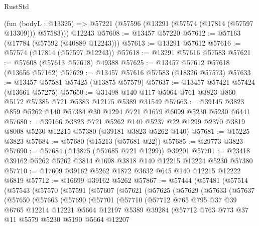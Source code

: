 \begin{lexlean}{RustStd}
\begin{coremodule}
    (fun (bodyL : @13325) => @57221 (@57596 (@13291 (@57574 (@17814 (@57597 @13309))) @57583)))
    @12243
@57608 := @13457 @57220
@57612 := @57163 (@17784 (@57592 (@40889 @12243)))
@57613 := @13291 @57612
@57616 := @57574 (@17814 (@57597 @12243))
@57618 := @13291 @57616 @57583
@57621 := @57608 (@57613 @57618) @49388
@57625 := @13457 @57612 @57618 (@13656 @57162)
@57629 := @13457 @57616 @57583 (@18326 @57573)
@57633 := @13457 @57581 @57425 (@13875 @57579)
@57637 := @13457 @57421 @57424 (@13661 @57275)
@57650 := @31498 @140 @117 @5064 @761 @3823 @860 @5172 @57385 @721 @5383 @12175 @5389 @31549
@57663 := @39145 @3823 @859 @5262 @140 @57384 @30 @1294 @721 @1679 @6099 @5230 @5230 @6441
@57680 := @39166
    @3823
    @721
    @5262
    @140
    @5237
    @22
    @1299
    @2370
    @3819
    @8008
    @5230
    @12215
    @57380
    (@39181 @3823 @5262 @140)
@57681 := @15225 @3823
@57684 := @57680 (@15213 (@57681 @22))
@57685 := @29773 @3823
@57690 := @57684 (@13875 (@57685 @721 @1299)) @39201
@57701 := @23418 @39162 @5262 @5262 @3814 @1698 @3818 @140 @12215 @12224 @5230 @57380
@57710 := @17609 @39162 @5262 @1872 @3632 @645 @140 @12215 @12222 @6819
@57712 := @16699 @39162 @5262
@57867 := @57444
    (@57481
      (@57514
        (@57543
          (@57570
            (@57591
              (@57607
                (@57621
                  (@57625
                    (@57629
                      (@57633
                        (@57637
                          (@57650
                            (@57663
                              (@57690
                                (@57701
                                  (@57710
                                    (@57712
                                      @765
                                      @795
                                      @37
                                      @39
                                      @6765
                                      @12214
                                      @12221
                                      @5664
                                      @12197
                                      @5389
                                      @39284
                                      (@57712
                                        @763
                                        @773
                                        @37
                                        @11
                                        @5579
                                        @5230
                                        @5190
                                        @5664
                                        @12207

\end{coremodule}
\end{lexlean}
